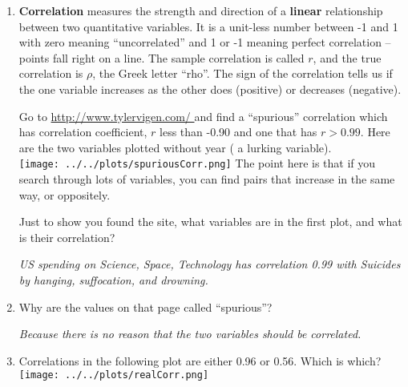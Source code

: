 \begin{enumerate}
\begin{key}
  {\it Women: less than one -- perhaps .75?  Men: slightly bigger than
    zero, like 1/30?  }
\end{key}

  \item {\bf Correlation} measures the strength and direction of a {\bf
  linear} relationship between two quantitative variables. It is a
unit-less number between -1 and 1 with zero meaning ``uncorrelated'' and
1 or -1 meaning perfect correlation -- points fall right on a
line. The sample correlation is called $r$, and the true correlation
is $\rho$, the Greek letter ``rho''. 
 The sign  of the correlation tells us if the one variable
 increases as the other does (positive) or decreases (negative).

   Go to  \url{http://www.tylervigen.com/ } and find a
    ``spurious'' correlation which has correlation coefficient, $r$ less
    than -0.90 and one that has $r > 0.99$.  Here are the two
    variables plotted without year ( a lurking variable).\\
\texttt{[image: ../../plots/spuriousCorr.png]}
    The point here is that if you search through lots of variables,
    you can find pairs that increase in the same way, or oppositely.

    Just to show you found the site, what variables are in the first
    plot, and what is their correlation?
\begin{students}
 \vspace{1cm}      
\end{students}

\begin{key}
  {\it  US spending on Science, Space, Technology has correlation 0.99
  with Suicides by hanging, suffocation, and drowning.}
\end{key}

\item Why are the values on that page called ``spurious''?
\begin{students}
 \vspace{1cm}      
\end{students}

\begin{key}
  {\it Because there is no reason that the two variables should be
    correlated. }
\end{key}

\item Correlations in the following plot are either 0.96 or 0.56.
  Which is which?\\
\texttt{[image: ../../plots/realCorr.png]}
\begin{students}
 \vspace{1cm}      
\end{students}


\end{enumerate}
